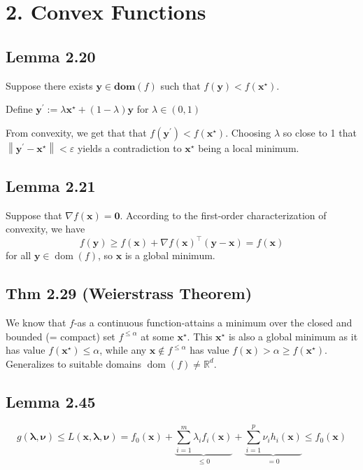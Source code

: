 \section*{2. Convex Functions}
\subsection*{Lemma 2.20}
Suppose there exists $\mathbf{y} \in \mathbf{d o m}(f)$ such that $f(\mathbf{y})<f\left(\mathbf{x}^{\star}\right)$.

Define $\mathbf{y}^{\prime}:=\lambda \mathbf{x}^{\star}+(1-\lambda) \mathbf{y}$ for $\lambda \in(0,1)$

From convexity, we get that that $f\left(\mathbf{y}^{\prime}\right)<f\left(\mathbf{x}^{\star}\right)$. Choosing $\lambda$ so close to 1 that $\left\|\mathbf{y}^{\prime}-\mathbf{x}^{\star}\right\|<\varepsilon$ yields a contradiction to $\mathbf{x}^{\star}$ being a local minimum.

\subsection*{Lemma 2.21}
Suppose that $\nabla f(\mathbf{x})=\mathbf{0}$. According to the first-order characterization of convexity, we have
$$
f(\mathbf{y}) \geq f(\mathbf{x})+\nabla f(\mathbf{x})^{\top}(\mathbf{y}-\mathbf{x})=f(\mathbf{x})
$$
for all $\mathbf{y} \in \operatorname{dom}(f)$, so $\mathbf{x}$ is a global minimum.

\subsection*{Thm 2.29 (Weierstrass Theorem)}
We know that $f$-as a continuous function-attains a minimum over the closed and bounded (= compact) set $f^{\leq \alpha}$ at some $\mathbf{x}^{\star}$. This $\mathbf{x}^{\star}$ is also a global minimum as it has value $f\left(\mathbf{x}^{\star}\right) \leq \alpha$, while any $\mathbf{x} \notin f^{\leq \alpha}$ has value $f(\mathbf{x})>\alpha \geq f\left(\mathbf{x}^{\star}\right)$.
Generalizes to suitable domains $\operatorname{dom}(f) \neq \mathbb{R}^{d}$.

\subsection*{Lemma 2.45}
$$
g(\boldsymbol{\lambda}, \boldsymbol{\nu}) \leq L(\mathbf{x}, \boldsymbol{\lambda}, \boldsymbol{\nu})=f_{0}(\mathbf{x})+\underbrace{\sum_{i=1}^{m} \lambda_{i} f_{i}(\mathbf{x})}_{\leq 0}+\underbrace{\sum_{i=1}^{p} \nu_{i} h_{i}(\mathbf{x})}_{=0} \leq f_{0}(\mathbf{x})
$$

